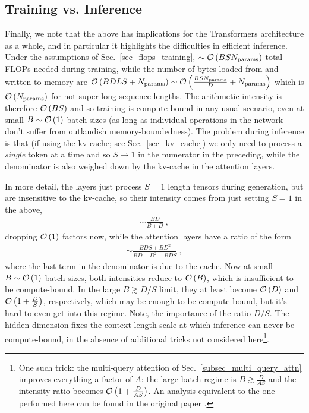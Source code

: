 \subsection{Training vs. Inference}

Finally, we note that the above has implications for the Transformers architecture as a whole, and
in particular it highlights the difficulties in efficient inference. Under the assumptions of
Sec.~\ref{sec_flops_training}, $ \sim \mathcal{O} \left( BSN _{ {\rm params}  }  \right)  $
total FLOPs needed during training, while the number of bytes loaded from and written to memory are
$ \mathcal{O} \left( BDLS + N _{ {\rm params}  } \right)  \sim \mathcal{O} \left( \frac{ BS N _{ {\rm params}  } }{ D}+ N _{ {\rm params}  } \right)  $
which is $ \mathcal{O} \left( N _{ {\rm  params}  } \right)  $ for not-super-long sequence lengths.  The
arithmetic intensity is therefore $ \mathcal{O} \left( BS \right)  $ and so training is compute-bound in any
usual scenario, even at small $B \sim \mathcal{O} \left( 1 \right)  $ batch sizes (as long as individual operations in the network don't suffer from outlandish
memory-boundedness). The problem during inference is that (if using the kv-cache; see
Sec.~\ref{sec_kv_cache}) we only need to process a \textit{single} token at a time and so $ S
	\longrightarrow 1 $ in the numerator in the preceding, while the denominator is also weighed down by
the  kv-cache in the attention layers.

In more detail, the  layers just process $ S=1 $ length tensors during generation, but
are insensitive to the kv-cache, so their intensity comes from just setting $ S=1 $ in the above,
\begin{align}
	\sim \frac{ BD  }{ B + D } \ ,
\end{align}
dropping $\mathcal{O} \left( 1 \right)  $ factors now, while the attention layers have a ratio of the form
\begin{align}
	\sim \frac{ BDS+BD ^{ 2 } }{ BD + D ^{ 2 }+BDS }\ ,
\end{align}
where the last term in the denominator is due to the cache. Now at small $B \sim \mathcal{O} \left( 1
	\right)  $ batch sizes, both intensities reduce to $ \mathcal{O} \left( B \right)  $, which is
insufficient to be compute-bound.  In the large $ B \gtrsim D/S $ limit, they at least become $ \mathcal{O} \left( D
	\right)  $ and $ \mathcal{O} \left( 1 + \frac{ D }{ S } \right)  $, respectively, which may be enough to be
compute-bound, but it's hard to even get into this regime. Note, the importance of the ratio $ D/S
$. The hidden dimension fixes the context length scale at which inference can never be
compute-bound, in the absence of additional tricks not considered here\footnote{One such trick: the
	multi-query attention of Sec.~\ref{subsec_multi_query_attn} improves everything a factor of $
		A $: the large batch regime is $ B \gtrsim \frac{ D }{ AS }$ and the intensity ratio becomes
	$ \mathcal{O} \left( 1 + \frac{ D }{ AS } \right)  $. An analysis equivalent to the one performed here can be found in the original paper
	\cite{shazeer2019fast}.}.

